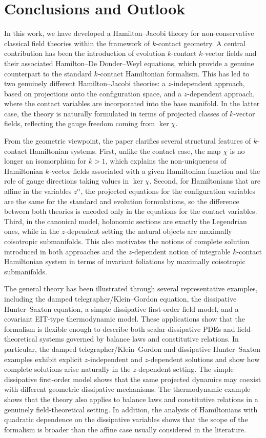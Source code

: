 \documentclass[11pt,twoside]{article}
\theoremstyle{plain}
\theoremstyle{definition}
\theoremstyle{remark}
\begin{document}
\section{Conclusions and Outlook}\label{sec:ConclusionsAndOutlook}
In this work, we have developed a Hamilton--Jacobi theory for non-conservative classical field theories within the framework of $k$-contact geometry. A central contribution has been the introduction of evolution $k$-contact $k$-vector fields and their associated Hamilton--De Donder--Weyl equations, which provide a genuine counterpart to the standard $k$-contact Hamiltonian formalism. This has led to two genuinely different Hamilton--Jacobi theories: a $z$-independent approach, based on projections onto the configuration space, and a $z$-dependent approach, where the contact variables are incorporated into the base manifold. In the latter case, the theory is naturally formulated in terms of projected classes of $k$-vector fields, reflecting the gauge freedom coming from $\ker\chi$.

From the geometric viewpoint, the paper clarifies several structural features of $k$-contact Hamiltonian systems. First, unlike the contact case, the map $\chi$ is no longer an isomorphism for $k>1$, which explains the non-uniqueness of Hamiltonian $k$-vector fields associated with a given Hamiltonian function and the role of gauge directions taking values in $\ker\chi$. Second, for Hamiltonians that are affine in the variables $z^\alpha$, the projected equations for the configuration variables are the same for the standard and evolution formulations, so the difference between both theories is encoded only in the equations for the contact variables. Third, in the canonical model, holonomic sections are exactly the Legendrian ones, while in the $z$-dependent setting the natural objects are maximally coisotropic submanifolds. This also motivates the notions of complete solution introduced in both approaches and the $z$-dependent notion of integrable $k$-contact Hamiltonian system in terms of invariant foliations by maximally coisotropic submanifolds.

The general theory has been illustrated through several representative examples, including the damped telegrapher/Klein--Gordon equation, the dissipative Hunter--Saxton equation, a simple dissipative first-order field model, and a covariant EIT-type thermodynamic model. These applications show that the formalism is flexible enough to describe both scalar dissipative PDEs and field-theoretical systems governed by balance laws and constitutive relations. In particular, the damped telegrapher/Klein--Gordon and dissipative Hunter--Saxton examples exhibit explicit $z$-independent and $z$-dependent solutions and show how complete solutions arise naturally in the $z$-dependent setting. The simple dissipative first-order model shows that the same projected dynamics may coexist with different geometric dissipative mechanisms. The thermodynamic example shows that the theory also applies to balance laws and constitutive relations in a genuinely field-theoretical setting. In addition, the analysis of Hamiltonians with quadratic dependence on the dissipative variables shows that the scope of the formalism is broader than the affine case usually considered in the literature.
\end{document}
